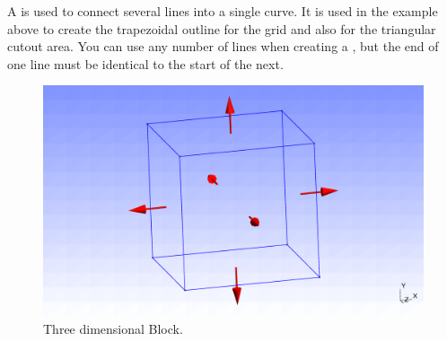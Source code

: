 A  is used to connect several lines into a single curve.
It is used in the example above to create the trapezoidal outline for the grid
and also for the triangular cutout area.
You can use any number of lines when creating a , but
the end of one line must be identical to the start of the next.


\begin{figure}
\centerline{\includegraphics[width=\figwidth]{figures/brick.eps}}
\caption{Three dimensional Block.}
\label{fig:PYCAD 2}
\end{figure}

